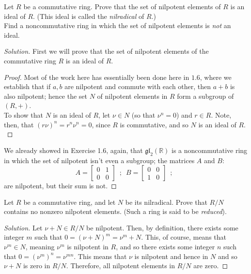 \documentclass[12pt]{article}
\newenvironment{problem}[2][Problem]{\begin{trivlist}
\item[\hskip \labelsep {\bfseries #1}\hskip \labelsep {\bfseries #2.}]}{\end{trivlist}}
\newenvironment{solution}
  {\renewcommand\qedsymbol{$\blacksquare$}\begin{proof}[Solution]}
{\end{proof}}
\newenvironment{sproof}{
  \renewcommand\qedsymbol{$\square$}
  \begin{proof}
  }{
  \end{proof}
}
\theoremstyle{remark}
\begin{document}
\begin{problem}{3.12}
  Let $R$ be a commutative ring.
  Prove that the set of nilpotent elements of $R$ is an ideal of $R$.
  (This ideal is called the \textit{nilradical} of $R$.) \\
  \indent Find a noncommutative ring in which the set of nilpotent elements is \textit{not}
  an ideal.
\end{problem}
\begin{solution}
  First we will prove that the set of nilpotent elements of the commutative ring $R$
  is an ideal of $R$.
  \begin{sproof}
    Most of the work here has essentially been done here in $1.6$, where we establish
    that if $a,b$ are nilpotent and commute with each other, then $a+b$ is also nilpotent;
    hence the set $N$ of nilpotent elements in $R$ form a subgroup of $(R,+)$.\\
    \indent To show that $N$ is an ideal of $R$, let $\nu\in N$ (so that $\nu^n=0$) 
    and $r\in R$.
    Note, then, that $(r\nu)^n=r^n\nu^n=0$, since $R$ is commutative, and so $N$ is an ideal
    of $R$.\\
  \end{sproof}
    \indent We already showed in Exercise 1.6, again, that $\mathfrak{gl}_2(\mathbb{R})$ is a noncommutative 
    ring in which the set of nilpotent isn't even a subgroup; the matrices $A$ and $B$:
    \begin{equation*}
      A=\begin{bmatrix} 0 & 1 \\ 0 & 0 \end{bmatrix}\enspace;\enspace
      B=\begin{bmatrix} 0 & 0 \\ 1 & 0 \end{bmatrix}\enspace;\enspace
    \end{equation*}
    are nilpotent, but their sum is not.
\end{solution}

\newpage

\begin{problem}{3.13}
  Let $R$ be a commutative ring, and let $N$ be its nilradical.
  Prove that $R/N$ contains no nonzero nilpotent elements.
  (Such a ring is said to be \textit{reduced}).
\end{problem}
\begin{solution}
  Let $\nu+N\in R/N$ be nilpotent.
  Then, by definition, there exists some integer $m$ such that $0=(\nu+N)^m=\nu^m+N$.
  This, of course, means that $\nu^m\in N$, meaning $\nu^m$ is nilpotent in $R$,
  and so there exists some integer $n$ such that $0=(\nu^m)^n = \nu^{mn}$.
  This means that $\nu$ is nilpotent and hence in $N$ and so $\nu+N$ is zero in $R/N$.
  Therefore, all nilpotent elements in $R/N$ are zero.
\end{solution}
\end{document}
